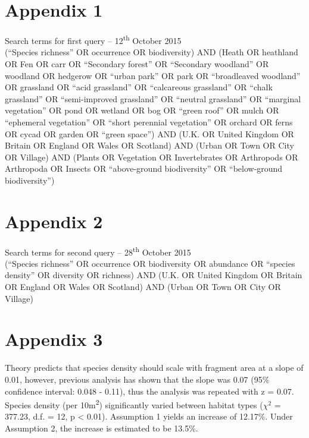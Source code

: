 
\ifappendixStyle %
\else
\section*{Appendix 1}
\fi
Search terms for first query -- 12\textsuperscript{th} October 2015
\\ \newline
(``Species richness'' OR occurrence OR biodiversity) AND (Heath OR heathland OR Fen OR carr OR ``Secondary forest'' OR ``Secondary woodland'' OR woodland OR hedgerow OR ``urban park'' OR park OR ``broadleaved woodland'' OR grassland OR ``acid grassland'' OR ``calcareous grassland'' OR ``chalk grassland'' OR ``semi-improved grassland'' OR ``neutral grassland'' OR ``marginal vegetation'' OR pond OR wetland OR bog OR ``green roof'' OR mulch OR ``ephemeral vegetation'' OR ``short perennial vegetation'' OR orchard OR ferns OR cycad OR garden OR ``green space'') AND (U.K. OR United Kingdom OR Britain OR England OR Wales OR Scotland) AND (Urban OR Town OR City OR Village) AND (Plants OR Vegetation OR Invertebrates OR Arthropods OR Arthropoda OR Insects OR ``above-ground biodiversity'' OR ``below-ground biodiversity'')

\ifappendixStyle %
\else
\section*{Appendix 2}
\fi
Search terms for second query -- 28\textsuperscript{th} October 2015
\\ \newline
(``Species richness'' OR occurrence OR biodiversity OR abundance OR ``species density'' OR diversity OR richness) AND (U.K. OR United Kingdom OR Britain OR England OR Wales OR Scotland) AND (Urban OR Town OR City OR Village)

\ifappendixStyle %
\else
\section*{Appendix 3}
\fi

Theory predicts that species density should scale with fragment area at a slope of 0.01, however, previous analysis has shown that the slope was 0.07 (95\% confidence interval: 0.048 - 0.11), thus the analysis was repeated with z = 0.07.  Species density (per 10m\textsuperscript{2}) significantly varied between habitat types ($\chi^2$ = 377.23, d.f. = 12, p < 0.01).  Assumption 1 yields an increase of 12.17\%. Under Assumption 2, the increase is estimated to be 13.5\%.